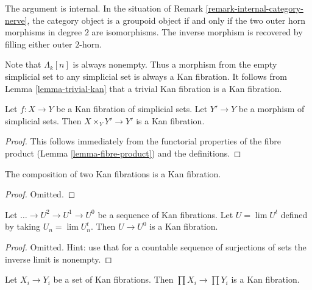 \begin{remark}
\label{remark-internal-groupoid-nerve}
The argument is internal. In the situation of
Remark \ref{remark-internal-category-nerve}, the category object is a
groupoid object if and only if the two outer horn morphisms in degree $2$ are
isomorphisms. The inverse morphism is recovered by filling either outer
$2$-horn.
\end{remark}

\noindent
Note that $\Lambda_k[n]$ is always nonempty. Thus a morphism from the empty
simplicial set to any simplicial set is always a Kan fibration. It follows
from Lemma \ref{lemma-trivial-kan} that a trivial Kan fibration is a
Kan fibration.

\begin{lemma}
\label{lemma-kan-base-change}
Let $f : X \to Y$ be a Kan fibration of simplicial sets.
Let $Y' \to Y$ be a morphism of simplicial sets.
Then $X \times_Y Y' \to Y'$ is a Kan fibration.
\end{lemma}

\begin{proof}
This follows immediately from the functorial properties of the fibre
product (Lemma \ref{lemma-fibre-product}) and the definitions.
\end{proof}

\begin{lemma}
\label{lemma-kan-composition}
The composition of two Kan fibrations is a Kan fibration.
\end{lemma}

\begin{proof}
Omitted.
\end{proof}

\begin{lemma}
\label{lemma-limit-kan}
Let $\ldots \to U^2 \to U^1 \to U^0$ be a sequence of Kan
fibrations. Let $U = \lim U^t$ defined by taking $U_n = \lim U_n^t$.
Then $U \to U^0$ is a Kan fibration.
\end{lemma}

\begin{proof}
Omitted. Hint: use that for a countable sequence of surjections of sets
the inverse limit is nonempty.
\end{proof}

\begin{lemma}
\label{lemma-product-kan}
Let $X_i \to Y_i$ be a set of Kan fibrations. Then
$\prod X_i \to \prod Y_i$ is a Kan fibration.
\end{lemma}

